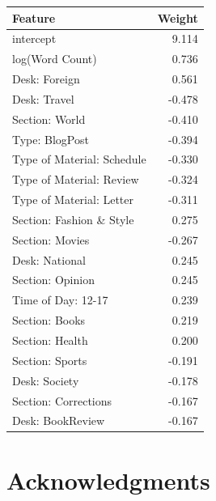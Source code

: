 \documentclass[fleqn,12pt]{SelfArx} %
\begin{document}
\begin{center}
\begin{tabular}{lr}
\toprule
Feature  &  Weight\\
\midrule
intercept & 9.114\\
log(Word Count) & 0.736\\
Desk: Foreign & 0.561\\
Desk: Travel & -0.478\\
Section: World & -0.410\\
Type: BlogPost & -0.394\\
Type of Material: Schedule & -0.330\\
Type of Material: Review & -0.324\\
Type of Material: Letter & -0.311\\
Section: Fashion \& Style & 0.275\\
Section: Movies & -0.267\\
Desk: National & 0.245\\
Section: Opinion & 0.245\\
Time of Day: 12-17 & 0.239\\
Section: Books & 0.219\\
Section: Health & 0.200\\
Section: Sports & -0.191\\
Desk: Society & -0.178\\
Section: Corrections & -0.167\\
Desk: BookReview & -0.167\\
\end{tabular}
\end{center}
\section*{Acknowledgments} %





\end{document}
